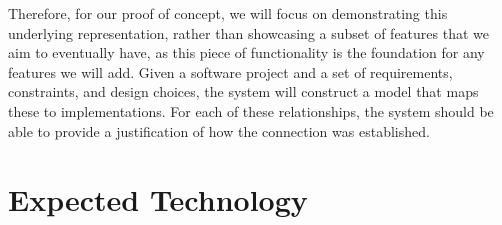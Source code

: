 \documentclass{article}
\begin{document}
Therefore, for our proof of concept, we will focus on demonstrating this underlying representation, rather than showcasing a subset of features that we aim to eventually have, as this piece of functionality is the foundation for any features we will add. Given a software project and a set of requirements, constraints, and design choices, the system will construct a model that maps these to implementations. For each of these relationships, the system should be able to provide a justification of how the connection was established.


\section{Expected Technology}


\end{document}
